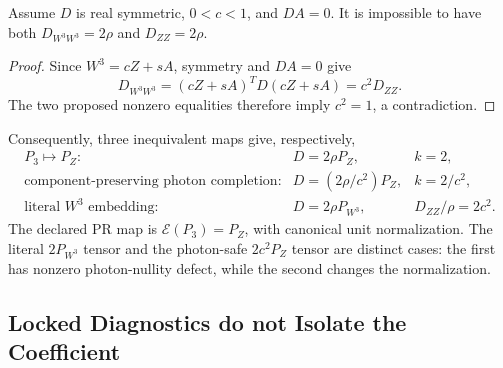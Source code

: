 \begin{proposition}
\label{prop:pr35-d3-mixing-nogo}
Assume $D$ is real symmetric, $0<c<1$, and $DA=0$.  It is impossible to have both $D_{W^3W^3}=2\rho$ and $D_{ZZ}=2\rho$.
\end{proposition}

\begin{proof}
Since $W^3=cZ+sA$, symmetry and $DA=0$ give
\begin{equation}
 D_{W^3W^3}=(cZ+sA)^TD(cZ+sA)=c^2D_{ZZ}.
\end{equation}
The two proposed nonzero equalities therefore imply $c^2=1$, a contradiction.
\end{proof}

Consequently, three inequivalent maps give, respectively,
\begin{equation}
 \begin{array}{lll}
 P_3\mapsto P_Z:&D=2\rho P_Z,&k=2,\\
 \text{component-preserving photon completion}:&
 D=(2\rho/c^2)P_Z,&k=2/c^2,\\
 \text{literal }W^3\text{ embedding}:&D=2\rho P_{W^3},&
 D_{ZZ}/\rho=2c^2.
 \end{array}
 \label{eq:pr35-d3-three-neutral-maps}
\end{equation}
The declared PR map is $\mathcal E(P_3)=P_Z$, with canonical unit normalization.  The literal $2P_{W^3}$ tensor and the photon-safe $2c^2P_Z$ tensor are distinct cases: the first has nonzero photon-nullity defect, while the second changes the normalization.

\subsection{Locked Diagnostics do not Isolate the Coefficient}

